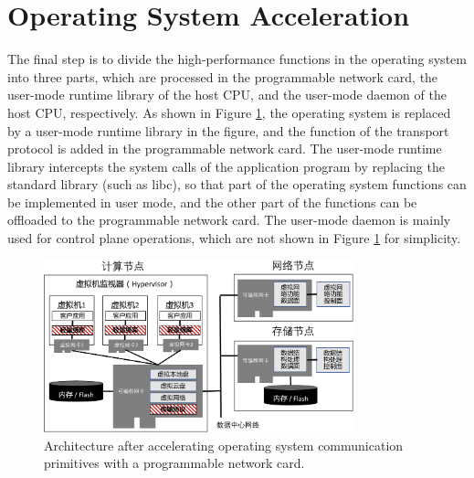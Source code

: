 \section{Operating System Acceleration}

The final step is to divide the high-performance functions in the operating system into three parts, which are processed in the programmable network card, the user-mode runtime library of the host CPU, and the user-mode daemon of the host CPU, respectively.
As shown in Figure \ref{arch:fig:os-primitives-accel}, the operating system is replaced by a user-mode runtime library in the figure, and the function of the transport protocol is added in the programmable network card.
The user-mode runtime library intercepts the system calls of the application program by replacing the standard library (such as libc), so that part of the operating system functions can be implemented in user mode, and the other part of the functions can be offloaded to the programmable network card.
The user-mode daemon is mainly used for control plane operations, which are not shown in Figure \ref{arch:fig:os-primitives-accel} for simplicity.

\begin{figure}[htbp]
	\centering
	\includegraphics[width=0.8\textwidth]{figures/os_primitives_accel.pdf}
	\caption{Architecture after accelerating operating system communication primitives with a programmable network card.}
	\label{arch:fig:os-primitives-accel}
\end{figure}

